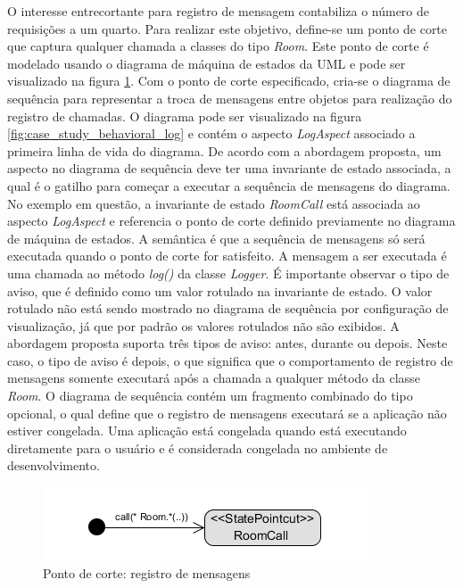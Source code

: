O interesse entrecortante para registro de mensagem contabiliza o número de requisições a um quarto. Para realizar este objetivo, define-se um ponto
de corte que captura qualquer chamada a classes do tipo \textit{Room}. Este ponto de corte é modelado usando o diagrama de máquina de estados da UML e 
pode ser visualizado na figura \ref{fig:case_study_behavioral_pointcut_log}. Com o ponto de corte especificado, cria-se o diagrama de sequência para
representar a troca de mensagens entre objetos para realização do registro de chamadas. O diagrama pode ser visualizado 
na figura \ref{fig:case_study_behavioral_log} e contém o aspecto \textit{LogAspect} associado a primeira linha de vida do diagrama. De acordo com a
abordagem proposta, um aspecto no diagrama de sequência deve ter uma invariante de estado associada, a qual é o gatilho 
para começar a executar a sequência de mensagens do diagrama. No exemplo em questão, a invariante de estado \textit{RoomCall} está associada ao
aspecto \textit{LogAspect} e referencia o ponto de corte definido previamente no diagrama de máquina de estados. A semântica é que 
a sequência de mensagens só será executada quando o ponto de corte for satisfeito. A mensagem a ser executada
é uma chamada ao método \textit{log()} da classe \textit{Logger}. É importante observar o tipo de aviso, que é definido como um valor rotulado na
invariante de estado. O valor rotulado não está sendo mostrado no diagrama de sequência por configuração de visualização, já que por padrão os valores 
rotulados não são exibidos. A abordagem proposta suporta três tipos de aviso: antes, durante ou depois. Neste caso, o
tipo de aviso é depois, o que significa que o comportamento de registro de mensagens somente executará após a chamada a qualquer método da classe
\textit{Room}. O diagrama de sequência contém um fragmento combinado do tipo opcional, o qual define que o registro de mensagens executará se a
aplicação não estiver congelada. Uma aplicação está congelada quando está executando diretamente para o usuário e é considerada congelada no ambiente
de desenvolvimento.

  \begin{figure}
	\centering
	\includegraphics{img/case_study_behavioral_pointcut_log.png}
	\caption{Ponto de corte: registro de mensagens}\label{fig:case_study_behavioral_pointcut_log}
  \end{figure}
  
